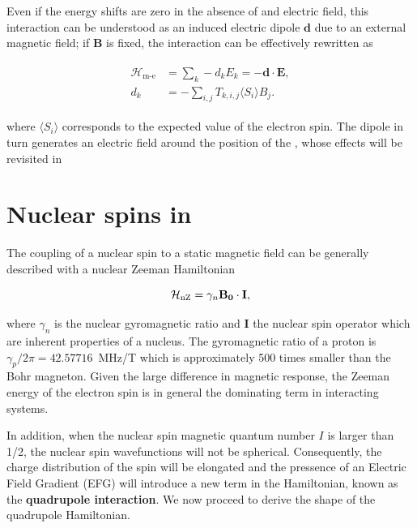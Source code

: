 Even if the energy shifts are zero in the absence of and electric field, this interaction can be understood as an induced electric dipole $\mathbf{d}$ due to an external magnetic field; if $\mathbf{B}$ is fixed, the interaction can be effectively rewritten as 

\begin{align}
\begin{split}
    \mathcal{H}_{\text{m-e}} &= \sum_k-d_k E_k = -\mathbf{d} \cdot \mathbf{E}, \\
    d_k &= - \sum_{i,j} T_{k, i, j} \langle S_{i}\rangle B_j.
\end{split}
\label{seq:electric_dipole}
\end{align}

where $\langle S_i \rangle$ corresponds to the expected value of the electron spin. The dipole in turn generates an electric field around the position of the \Er, whose effects will be revisited in 


\section[Nuclear spins in CaWO4]{Nuclear spins in \Ca}

The coupling of a nuclear spin to a static magnetic field can be generally described with a nuclear Zeeman Hamiltonian

\begin{equation}
    \mathcal{H}_{\text{nZ}} = \gamma_n \mathbf{B_0}\cdot\mathbf{I},
\end{equation}

\noindent where $\gamma_n$ is the nuclear gyromagnetic ratio and $\mathbf{I}$ the nuclear spin operator which are inherent properties of a nucleus. The gyromagnetic ratio of a proton is $\gamma_p/2\pi = 42.57716$~MHz/T  which is approximately 500 times smaller than the Bohr magneton. Given the large difference in magnetic response, the Zeeman energy of the electron spin is in general the dominating term in interacting systems. 

In addition, when the nuclear spin magnetic quantum number $I$ is larger than 1/2, the nuclear spin wavefunctions will not be spherical. Consequently, the charge distribution of the spin will be elongated and the pressence of an Electric Field Gradient (EFG) will introduce a new term in the Hamiltonian, known as the \textbf{quadrupole interaction}. We now proceed to derive the shape of the quadrupole Hamiltonian. 

